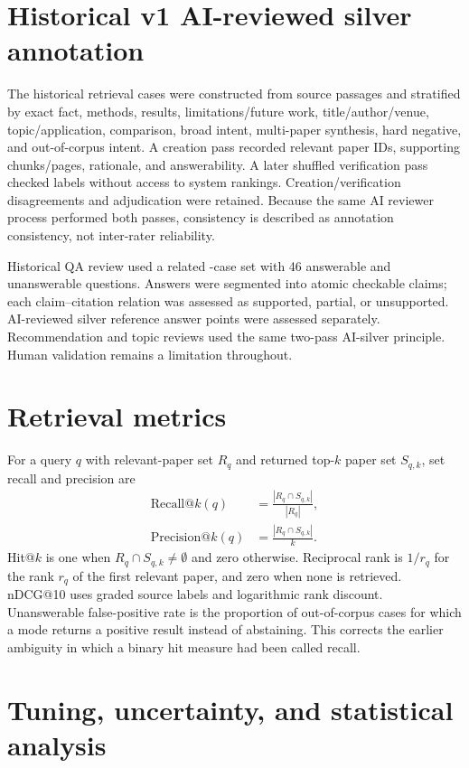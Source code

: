 \section{Historical v1 AI-reviewed silver annotation}

The historical retrieval cases were constructed from source passages and stratified by exact fact, methods, results, limitations/future work, title/author/venue, topic/application, comparison, broad intent, multi-paper synthesis, hard negative, and out-of-corpus intent. A creation pass recorded relevant paper IDs, supporting chunks/pages, rationale, and answerability. A later shuffled verification pass checked labels without access to system rankings. Creation/verification disagreements and adjudication were retained. Because the same AI reviewer process performed both passes, consistency is described as annotation consistency, not inter-rater reliability.

Historical QA review used a related \QaCaseCount{}-case set with 46 answerable and \QaUnanswerableCaseCount{} unanswerable questions. Answers were segmented into atomic checkable claims; each claim--citation relation was assessed as supported, partial, or unsupported. AI-reviewed silver reference answer points were assessed separately. Recommendation and topic reviews used the same two-pass AI-silver principle. Human validation remains a limitation throughout.

\section{Retrieval metrics}

For a query $q$ with relevant-paper set $R_q$ and returned top-$k$ paper set $S_{q,k}$, set recall and precision are
\begin{align}
\mathrm{Recall@}k(q) &= \frac{|R_q\cap S_{q,k}|}{|R_q|}, \\
\mathrm{Precision@}k(q) &= \frac{|R_q\cap S_{q,k}|}{k}.
\end{align}
Hit@$k$ is one when $R_q\cap S_{q,k}\neq\emptyset$ and zero otherwise. Reciprocal rank is $1/r_q$ for the rank $r_q$ of the first relevant paper, and zero when none is retrieved. nDCG@10 uses graded source labels and logarithmic rank discount. Unanswerable false-positive rate is the proportion of out-of-corpus cases for which a mode returns a positive result instead of abstaining. This corrects the earlier ambiguity in which a binary hit measure had been called recall.

\section{Tuning, uncertainty, and statistical analysis}

